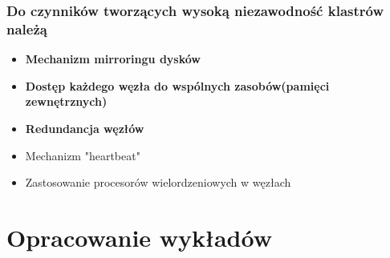 \documentclass[a4paper,twoside]{article}
\begin{document}
\section{Do czynników tworzących wysoką niezawodność klastrów należą}
	\begin{itemize}
    \item \textbf{Mechanizm mirroringu dysków}
    \item \textbf{Dostęp każdego węzła do wspólnych zasobów(pamięci zewnętrznych)}
    \item \textbf{Redundancja węzłów}
    \item Mechanizm "heartbeat"
    \item Zastosowanie procesorów wielordzeniowych w węzłach
    \end{itemize}

\newpage
\part*{Opracowanie wykładów}
\end{document}
